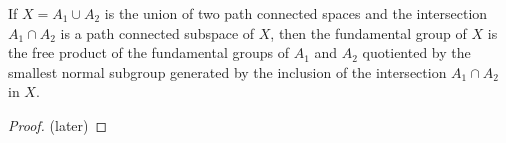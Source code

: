 
\begin{theorem}
	If $X=A_1\cup A_2$ is the union of two path connected spaces and the intersection $A_1\cap A_2$ is a path connected subspace of $X$, then the fundamental group of $X$ is the free product of the fundamental groups of $A_1$ and $A_2$ quotiented by the smallest normal subgroup generated by the inclusion of the intersection $A_1\cap A_2$ in $X$.
\end{theorem}
\begin{proof}
	(later)
\end{proof}